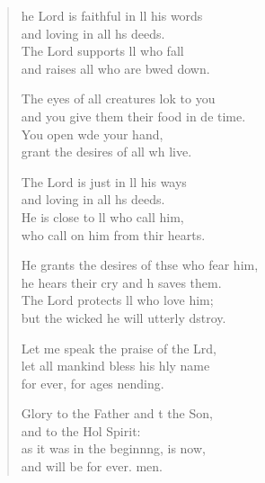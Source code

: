 \settowidth{\versewidth}{He grants the desires of those who fear him, *}
\begin{verse}%
  \begin{patverse}
he Lord is faithful in ll his words\Med\\
and loving in all h\pointup{\i}s deeds.\\
The Lord supports ll who fall\Med\\
and raises all who are bwed down.

The eyes of all creatures lok to you\Med\\
and you give them their food in de time.\\
You open w\pointup{\i}de your hand,\Med\\
grant the desires of all wh live.

The Lord is just in ll his ways\Med\\
and loving in all h\pointup{\i}s deeds.\\
He is close to ll who call him,\Med\\
who call on him from thir hearts.

He grants the desires of thse who fear him,\Med\\
he hears their cry and h saves them.\\
The Lord protects ll who love him;\Med\\
but the wicked he will utterly dstroy.

Let me speak the praise of the Lrd,\Flex\\
let all mankind bless his hly name\Med\\
for ever, for ages nending.

Glory to the Father and t the Son,\Med\\
and to the Hol Spirit:\\
as it was in the beginn\pointup{\i}ng, is now,\Med\\
and will be for ever. men.
  \end{patverse}
\end{verse}
